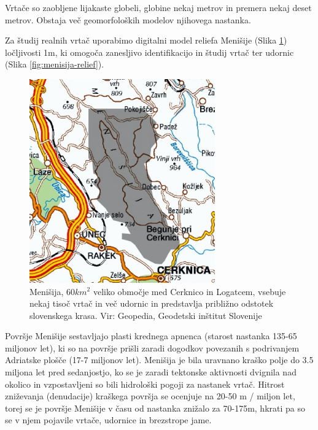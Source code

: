 \documentclass[a4paper, oneside, 12pt]{book}
\begin{document}
        Vrtače so zaobljene lijakaste globeli, globine nekaj metrov in premera nekaj deset metrov. Obstaja več geomorfoloških modelov njihovega nastanka.

        Za študij realnih vrtač uporabimo digitalni model reliefa Menišije (Slika \ref{fig:menisija-karta}) ločljivosti 1m, ki omogoča zanesljivo identifikacijo in študij vrtač ter udornic (Slika \ref{fig:menisija-relief}).

        \begin{figure}[H]
          \centering
          \includegraphics[width=8cm]{slike/menisija-karta}
          \caption{Menišija, $60 km^2$ veliko območje med Cerknico in Logatcem, vsebuje nekaj tisoč vrtač in več udornic in predstavlja približno odstotek slovenskega krasa. Vir: Geopedia, Geodetski inštitut Slovenije}
          \label{fig:menisija-karta}
        \end{figure}

        Površje Menišije sestavljajo plasti krednega apnenca (starost nastanka 135-65 miljonov let), ki so na površje prišli zaradi dogodkov povezanih s podrivanjem Adriatske plošče (17-7 miljonov let). Menišija je bila uravnano kraško polje do 3.5 miljona let pred sedanjostjo, ko se je zaradi tektonske aktivnosti dvignila nad okolico in vzpostavljeni so bili hidrološki pogoji za nastanek vrtač. Hitrost zniževanja (denudacije) kraškega površja se ocenjuje na 20-50 m / miljon let, torej se je površje Menišije v času od nastanka znižalo za 70-175m, hkrati pa so se v njem pojavile vrtače, udornice in brezstrope jame. \cite{Vrabec2006} \cite{Placer2010}
\end{document}
